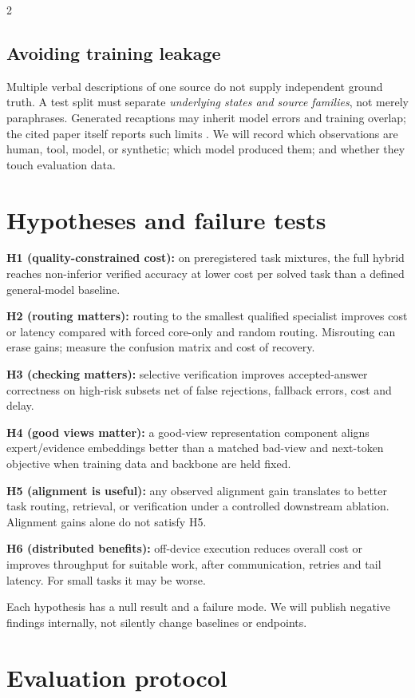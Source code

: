 \documentclass[10pt,letterpaper]{article}
\begin{document}
\begin{multicols}{2}
\subsection{Avoiding training leakage}
Multiple verbal descriptions of one source do not supply independent ground truth. A test split must separate \emph{underlying states and source families}, not merely paraphrases. Generated recaptions may inherit model errors and training overlap; the cited paper itself reports such limits \cite{balestriero2026}. We will record which observations are human, tool, model, or synthetic; which model produced them; and whether they touch evaluation data.

\section{Hypotheses and failure tests}
\noindent\textbf{H1 (quality-constrained cost):} on preregistered task mixtures, the full hybrid reaches non-inferior verified accuracy at lower cost per solved task than a defined general-model baseline.

\noindent\textbf{H2 (routing matters):} routing to the smallest qualified specialist improves cost or latency compared with forced core-only and random routing. Misrouting can erase gains; measure the confusion matrix and cost of recovery.

\noindent\textbf{H3 (checking matters):} selective verification improves accepted-answer correctness on high-risk subsets net of false rejections, fallback errors, cost and delay.

\noindent\textbf{H4 (good views matter):} a good-view representation component aligns expert/evidence embeddings better than a matched bad-view and next-token objective when training data and backbone are held fixed.

\noindent\textbf{H5 (alignment is useful):} any observed alignment gain translates to better task routing, retrieval, or verification under a controlled downstream ablation. Alignment gains alone do not satisfy H5.

\noindent\textbf{H6 (distributed benefits):} off-device execution reduces overall cost or improves throughput for suitable work, after communication, retries and tail latency. For small tasks it may be worse.

Each hypothesis has a null result and a failure mode. We will publish negative findings internally, not silently change baselines or endpoints.

\section{Evaluation protocol}

\end{multicols}
\end{document}
